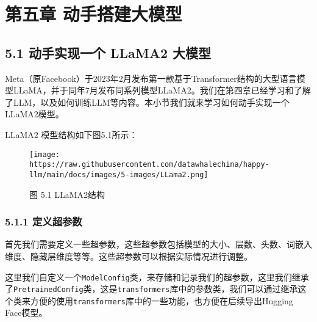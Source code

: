\documentclass[
]{article}
\author{}
\date{}
\begin{document}
{
\setcounter{tocdepth}{3}
\tableofcontents
}
\section{第五章
动手搭建大模型}\label{ux7b2cux4e94ux7ae0-ux52a8ux624bux642dux5efaux5927ux6a21ux578b}

\subsection{5.1 动手实现一个 LLaMA2
大模型}\label{ux52a8ux624bux5b9eux73b0ux4e00ux4e2a-llama2-ux5927ux6a21ux578b}

Meta（原Facebook）于2023年2月发布第一款基于Transformer结构的大型语言模型LLaMA，并于同年7月发布同系列模型LLaMA2。我们在第四章已经学习和了解了LLM，以及如何训练LLM等内容。本小节我们就来学习如何动手实现一个LLaMA2模型。

LLaMA2 模型结构如下图5.1所示：

\begin{figure}[htbp]\centering
\texttt{[image: https://raw.githubusercontent.com/datawhalechina/happy-llm/main/docs/images/5-images/LLama2.png]}
\caption{图 5.1 LLaMA2结构}
\end{figure}

\subsubsection{5.1.1 定义超参数}\label{ux5b9aux4e49ux8d85ux53c2ux6570}

首先我们需要定义一些超参数，这些超参数包括模型的大小、层数、头数、词嵌入维度、隐藏层维度等等。这些超参数可以根据实际情况进行调整。

这里我们自定义一个\texttt{ModelConfig}类，来存储和记录我们的超参数，这里我们继承了\texttt{PretrainedConfig}类，这是\texttt{transformers}库中的参数类，我们可以通过继承这个类来方便的使用\texttt{transformers}库中的一些功能，也方便在后续导出Hugging
Face模型。
\end{document}
